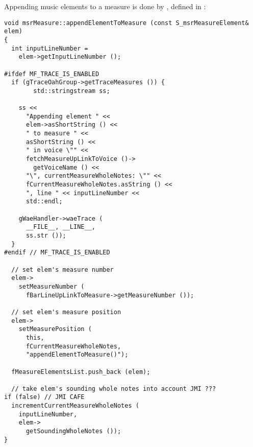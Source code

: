 Appending music elements to a measure is done by , defined in :%
\begin{lstlisting}[language=CPlusPlus]
void msrMeasure::appendElementToMeasure (const S_msrMeasureElement& elem)
{
  int inputLineNumber =
    elem->getInputLineNumber ();

#ifdef MF_TRACE_IS_ENABLED
  if (gTraceOahGroup->getTraceMeasures ()) {
		std::stringstream ss;

    ss <<
      "Appending element " <<
      elem->asShortString () <<
      " to measure " <<
      asShortString () <<
      " in voice \"" <<
      fetchMeasureUpLinkToVoice ()->
        getVoiceName () <<
      "\", currentMeasureWholeNotes: \"" <<
      fCurrentMeasureWholeNotes.asString () <<
      ", line " << inputLineNumber <<
      std::endl;

    gWaeHandler->waeTrace (
      __FILE__, __LINE__,
      ss.str ());
  }
#endif // MF_TRACE_IS_ENABLED

  // set elem's measure number
  elem->
    setMeasureNumber (
      fBarLineUpLinkToMeasure->getMeasureNumber ());

  // set elem's measure position
  elem->
    setMeasurePosition (
      this,
      fCurrentMeasureWholeNotes,
      "appendElementToMeasure()");

  fMeasureElementsList.push_back (elem);

  // take elem's sounding whole notes into account JMI ???
if (false) // JMI CAFE
  incrementCurrentMeasureWholeNotes (
    inputLineNumber,
    elem->
      getSoundingWholeNotes ());
}
\end{lstlisting}

